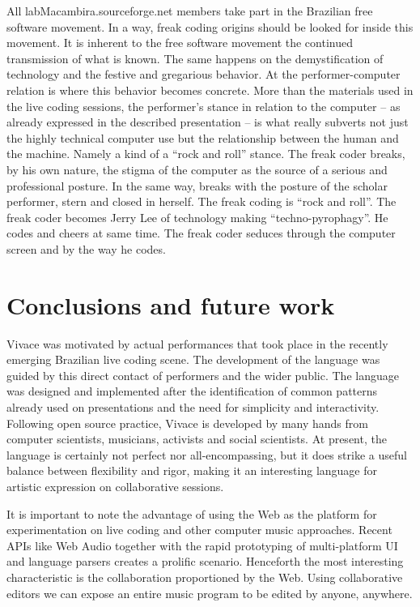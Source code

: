 \documentclass[12pt,times,twocolumn]{article}
\begin{document}
All labMacambira.sourceforge.net members take part in the Brazilian
free software movement. In a way, freak coding origins should be
looked for inside this movement. It is inherent to the free software
movement the continued transmission of what is known. The same happens
on the demystification of technology and the festive and gregarious
behavior. At the performer-computer relation is where this behavior
becomes concrete. More than the materials used in the live coding
sessions, the performer's stance in relation to the computer -- as
already expressed in the described presentation -- is what really
subverts not just the highly technical computer use but the
relationship between the human and the machine. Namely a kind of a
``rock and roll'' stance. The freak coder breaks, by his own nature,
the stigma of the computer as the source of a serious and professional
posture. In the same way, breaks with the posture of the scholar
performer, stern and closed in herself. The freak coding is ``rock and
roll''. The freak coder becomes Jerry Lee of technology making
``techno-pyrophagy''. He codes and cheers at same time. The freak
coder seduces through the computer screen and by the way he codes.

\section{Conclusions and future work}
Vivace was motivated by actual performances that took place in the
recently emerging Brazilian live coding scene. The development of the
language was guided by this direct contact of performers and the wider
public. The language was designed and implemented after the
identification of common patterns already used on
presentations and the need for simplicity and interactivity.
Following open source practice, Vivace is
developed by many hands from computer scientists, musicians, activists
and social scientists. At present, the language is certainly not perfect nor
all-encompassing, but it does strike a useful balance between
flexibility and rigor, making it an interesting language for artistic
expression on collaborative sessions.

It is important to note the advantage of using the Web as the platform
for experimentation on live coding and other computer music
approaches. Recent APIs like Web Audio together with the rapid
prototyping of multi-platform UI and language parsers creates a
prolific scenario. Henceforth the most interesting characteristic is
the collaboration proportioned by the Web. Using collaborative editors
we can expose an entire music program to be edited by anyone,
anywhere.
\end{document}
